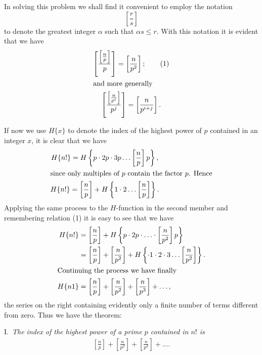 \documentclass[oneside]{book}
\begin{document}
In solving this problem we shall find it convenient to employ the
notation
\begin{equation*}
\left [ \frac{r}{s} \right ]
\end{equation*} to denote the greatest integer $\alpha$ such that
$\alpha s \leq r$. With this notation it is evident that we have
\begin{gather}
\left [
        \frac{\left [ \frac{n}{p} \right ]}
             {p}
\right ] = \left [ \frac{n}{p^2} \right ]; \tag{1} \\
\intertext{and more generally}
\left [
        \frac{\left [ \frac{n}{p^i} \right ]}
             {p^j}
\right ] = \left [ \frac{n}{p^{i+j}} \right ]. \notag
\end{gather}

If now we use $H\{x\}$ to denote the index of the highest power of
$p$ contained in an integer $x$, it is clear that we have
\begin{gather*}
H\{n!\} =
   H \left \{ p \cdot 2p \cdot 3p \ldots
          \left [ \frac{n}{p} \right ] p \right \}, \\
\intertext{since only multiples of $p$ contain the factor $p$.
Hence}
H\{n!\} =
  \left [ \frac{n}{p} \right ] +
     H \left \{ 1 \cdot 2 \ldots \left [ \frac{n}{p} \right ]
                                                           \right \}.
\end{gather*}
Applying the same process to the $H$-function in the second member
and remembering relation (1) it is easy to see that we have
\begin{align*}
H\{n!\} &= \left[ \frac{n}{p} \right] +
  H\left\{ p \cdot 2p \cdot \ldots \cdot
        \left[ \frac{n}{p^2} \right]p\right\} \\
   &= \left[\frac{n}{p}\right] + \left[\frac{n}{p^2}\right] +
         H \left\{\cdot 1 \cdot 2 \cdot 3
            \ldots \left[ \frac{n}{p^2} \right] \right\}. \\
\intertext{Continuing the process we have finally}
H\{n1\} &= \left[ \frac{n}{p} \right] +
  \left[ \frac{n}{p^2} \right] + \left[ \frac{n}{p^3} \right] +
                                                              \ldots,
\end{align*}
the series on the right containing evidently only a finite number of
terms different from zero. Thus we have the theorem:

\smallskip I.~\emph{The index of the highest power of a prime $p$
contained in $n!$ is}
\begin{gather*}
\left[ \frac{n}{p} \right] + \left[ \frac{n}{p^2} \right] +
  \left[ \frac{n}{p^3} \right] + \ldots.
\end{gather*}
\end{document}

